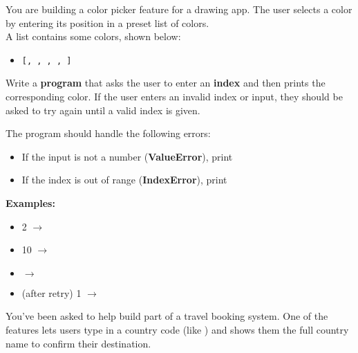 




	\item 
		You are building a color picker feature for a drawing app.  
		The user selects a color by entering its position in a preset list of colors.\\

		A list contains some colors, shown below:
		\begin{itemize}
			\item \texttt{[, , , , ]}
		\end{itemize}
		Write a \textbf{program} that asks the user to enter an \textbf{index} and then prints the 
		corresponding color. If the user enters an invalid index or input, they should be asked to 
		try again until a valid index is given.

		The program should handle the following errors:
		\begin{itemize}
			\item If the input is not a number (\textbf{ValueError}), 
				print 
			\item If the index is out of range (\textbf{IndexError}), 
				print 
		\end{itemize}

		\textbf{Examples:}
		\begin{itemize}
			\item {} 2 $\rightarrow$ 
			\item {} 10 $\rightarrow$ 
			\item {}  $\rightarrow$ 
			\item (after retry)  1 $\rightarrow$ 
		\end{itemize}



	\item 
		You've been asked to help build part of a travel booking system.  
		One of the features lets users type in a country code (like ) and shows them the 
		full country name to confirm their destination.


